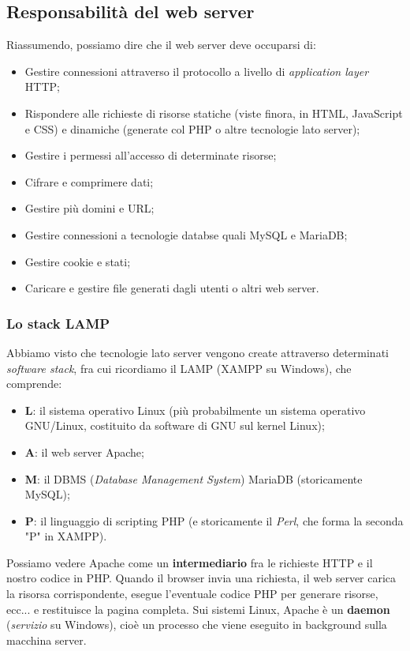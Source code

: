 \documentclass[a4paper,11pt]{article}
\begin{document}
\subsection{Responsabilità del web server}
Riassumendo, possiamo dire che il web server deve occuparsi di:
\begin{itemize}
	\item Gestire connessioni attraverso il protocollo a livello di \textit{application layer} HTTP;
	\item Rispondere alle richieste di risorse statiche (viste finora, in HTML, JavaScript e CSS) e dinamiche (generate col PHP o altre tecnologie lato server);
	\item Gestire i permessi all'accesso di determinate risorse;
	\item Cifrare e comprimere dati;
	\item Gestire più domini e URL;
	\item Gestire connessioni a tecnologie databse quali MySQL e MariaDB;
	\item Gestire cookie e stati;
	\item Caricare e gestire file generati dagli utenti o altri web server.
\end{itemize}

\subsubsection{Lo stack LAMP}
Abbiamo visto che tecnologie lato server vengono create attraverso determinati \textit{software stack}, fra cui ricordiamo il LAMP (XAMPP su Windows), che comprende:
\begin{itemize}
	\item \textbf{L}: il sistema operativo Linux (più probabilmente un sistema operativo GNU/Linux, costituito da software di GNU sul kernel Linux);
	\item \textbf{A}: il web server Apache;
	\item \textbf{M}: il DBMS (\textit{Database Management System}) MariaDB (storicamente MySQL);
	\item \textbf{P}: il linguaggio di scripting PHP (e storicamente il \textit{Perl}, che forma la seconda "P" in XAMPP).
\end{itemize}

Possiamo vedere Apache come un \textbf{intermediario} fra le richieste HTTP e il nostro codice in PHP.
Quando il browser invia una richiesta, il web server carica la risorsa corrispondente, esegue l'eventuale codice PHP per generare risorse, ecc... e restituisce la pagina completa.
Sui sistemi Linux, Apache è un \textbf{daemon} (\textit{servizio} su Windows), cioè un processo che viene eseguito in background sulla macchina server.
\end{document}
